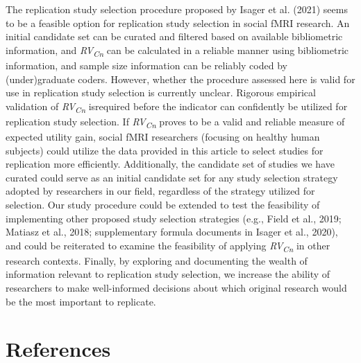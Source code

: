 \documentclass[
  english,
  man,floatsintext]{apa6}
\begin{document}
The replication study selection procedure proposed by Isager et al. (2021) seems to be a feasible option for replication study selection in social fMRI research. An initial candidate set can be curated and filtered based on available bibliometric information, and \emph{RV\textsubscript{Cn}} can be calculated in a reliable manner using bibliometric information, and sample size information can be reliably coded by (under)graduate coders. However, whether the procedure assessed here is valid for use in replication study selection is currently unclear. Rigorous empirical validation of \emph{RV\textsubscript{Cn}} isrequired before the indicator can confidently be utilized for replication study selection. If \emph{RV\textsubscript{Cn}} proves to be a valid and reliable measure of expected utility gain, social fMRI researchers (focusing on healthy human subjects) could utilize the data provided in this article to select studies for replication more efficiently. Additionally, the candidate set of studies we have curated could serve as an initial candidate set for any study selection strategy adopted by researchers in our field, regardless of the strategy utilized for selection. Our study procedure could be extended to test the feasibility of implementing other proposed study selection strategies (e.g., Field et al., 2019; Matiasz et al., 2018; supplementary formula documents in Isager et al., 2020), and could be reiterated to examine the feasibility of applying \emph{RV\textsubscript{Cn}} in other research contexts. Finally, by exploring and documenting the wealth of information relevant to replication study selection, we increase the ability of researchers to make well-informed decisions about which original research would be the most important to replicate.

\hypertarget{references}{%
\section*{References}\label{references}}
\end{document}
